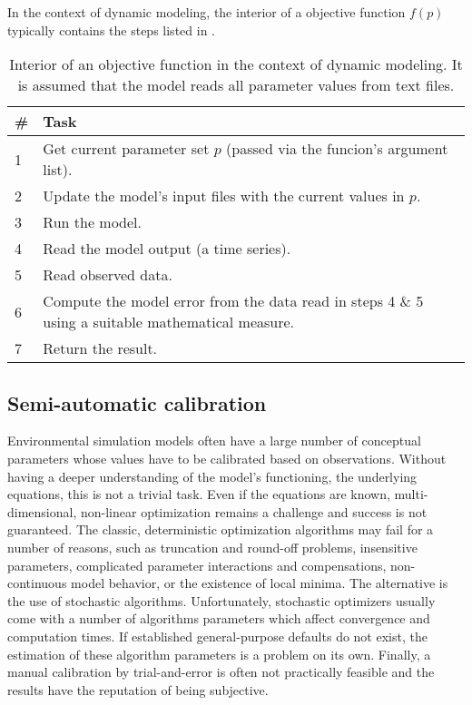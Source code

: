In the context of dynamic modeling, the interior of a objective function $f(p)$ typically contains the steps listed in .

\begin{table}
  \caption[Interior of an objective function in the context of dynamic modeling.]{Interior of an objective function in the context of dynamic modeling. It is assumed that the model reads all parameter values from text files. \label{tab:mops:background:objFun}}
  \begin{tabular}{p{}p{}} \hline\hline
  \# & Task \\ \hline
  1 & Get current parameter set $p$ (passed via the funcion's argument list). \\
  2 & Update the model's input files with the current values in $p$. \\
  3 & Run the model. \\
  4 & Read the model output (a time series). \\
  5 & Read observed data. \\
  6 & Compute the model error from the data read in steps 4 \& 5 using a suitable mathematical measure. \\
  7 & Return the result. \\ \hline\hline
  \end{tabular}
\end{table}

\subsection{Semi-automatic calibration} \label{sec:mops:background:semiAutoCalib}

Environmental simulation models often have a large number of conceptual parameters whose values have to be calibrated based on observations. Without having a deeper understanding of the model's functioning, \ie{} the underlying equations, this is not a trivial task. Even if the equations are known, multi-dimensional, non-linear optimization remains a challenge and success is not guaranteed. The classic, deterministic optimization algorithms may fail for a number of reasons, such as truncation and round-off problems, insensitive parameters, complicated parameter interactions and compensations, non-continuous model behavior, or the existence of local minima. The alternative is the use of stochastic algorithms. Unfortunately, stochastic optimizers usually come with a number of algorithms parameters which affect convergence and computation times. If established general-purpose defaults do not exist, the estimation of these algorithm parameters is a problem on its own. Finally, a manual calibration by trial-and-error is often not practically feasible and the results have the reputation of being subjective.

